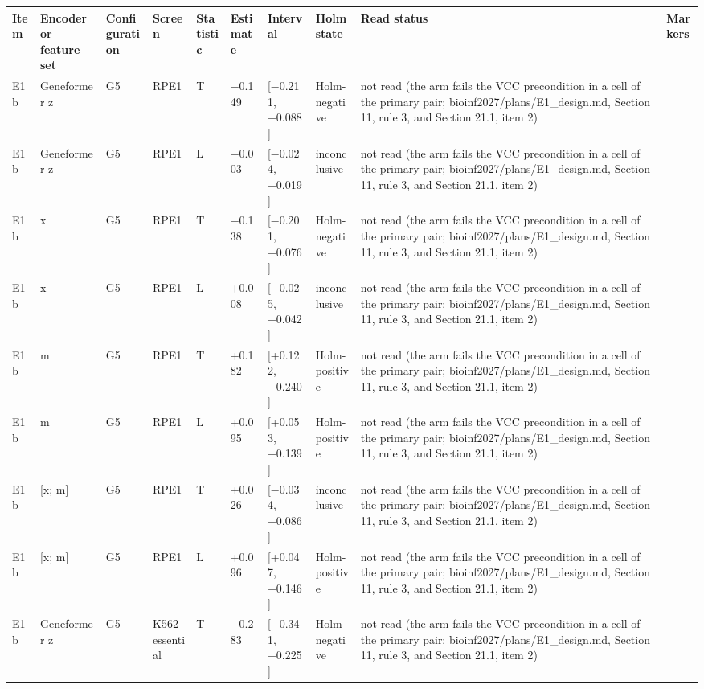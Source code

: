 \begin{tabular}{llllllllll}
\toprule
Item & Encoder or feature set & Configuration & Screen & Statistic & Estimate & Interval & Holm state & Read status & Markers \\
\midrule
E1b & Geneformer z & G5 & RPE1 & T & −0.149 & [−0.211, −0.088] & Holm-negative & not read (the arm fails the VCC precondition in a cell of the primary pair; bioinf2027/plans/E1\_design.md, Section 11, rule 3, and Section 21.1, item 2) &  \\
E1b & Geneformer z & G5 & RPE1 & L & −0.003 & [−0.024, +0.019] & inconclusive & not read (the arm fails the VCC precondition in a cell of the primary pair; bioinf2027/plans/E1\_design.md, Section 11, rule 3, and Section 21.1, item 2) &  \\
E1b & x & G5 & RPE1 & T & −0.138 & [−0.201, −0.076] & Holm-negative & not read (the arm fails the VCC precondition in a cell of the primary pair; bioinf2027/plans/E1\_design.md, Section 11, rule 3, and Section 21.1, item 2) &  \\
E1b & x & G5 & RPE1 & L & +0.008 & [−0.025, +0.042] & inconclusive & not read (the arm fails the VCC precondition in a cell of the primary pair; bioinf2027/plans/E1\_design.md, Section 11, rule 3, and Section 21.1, item 2) &  \\
E1b & m & G5 & RPE1 & T & +0.182 & [+0.122, +0.240] & Holm-positive & not read (the arm fails the VCC precondition in a cell of the primary pair; bioinf2027/plans/E1\_design.md, Section 11, rule 3, and Section 21.1, item 2) &  \\
E1b & m & G5 & RPE1 & L & +0.095 & [+0.053, +0.139] & Holm-positive & not read (the arm fails the VCC precondition in a cell of the primary pair; bioinf2027/plans/E1\_design.md, Section 11, rule 3, and Section 21.1, item 2) &  \\
E1b & [x; m] & G5 & RPE1 & T & +0.026 & [−0.034, +0.086] & inconclusive & not read (the arm fails the VCC precondition in a cell of the primary pair; bioinf2027/plans/E1\_design.md, Section 11, rule 3, and Section 21.1, item 2) &  \\
E1b & [x; m] & G5 & RPE1 & L & +0.096 & [+0.047, +0.146] & Holm-positive & not read (the arm fails the VCC precondition in a cell of the primary pair; bioinf2027/plans/E1\_design.md, Section 11, rule 3, and Section 21.1, item 2) &  \\
E1b & Geneformer z & G5 & K562-essential & T & −0.283 & [−0.341, −0.225] & Holm-negative & not read (the arm fails the VCC precondition in a cell of the primary pair; bioinf2027/plans/E1\_design.md, Section 11, rule 3, and Section 21.1, item 2) &  \\

\end{tabular}
